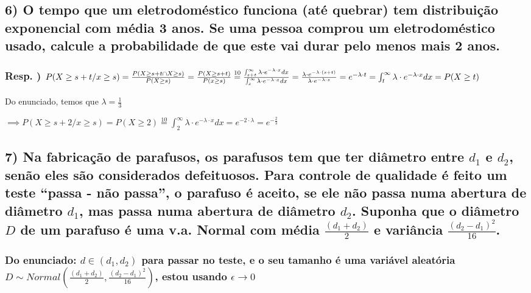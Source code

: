 \documentclass[english]{article}
\begin{document}
\textbf{\textcompwordmark{}}


\subsection*{\textmd{6) O tempo que um eletrodoméstico funciona (até quebrar)
tem distribuição exponencial com média 3 anos. Se uma pessoa comprou
um eletrodoméstico usado, calcule a probabilidade de que este vai
durar pelo menos mais 2 anos.}}


\subsubsection*{\textmd{Resp. ) $P(X\geq s+t/x\geq s)=\frac{P(X\geq s+t\cap X\geq s)}{P(X\geq s)}=\frac{P(X\geq s+t)}{P(x\geq s)}\protect\overset{10}{=}\frac{\int_{s+t}^{\infty}\lambda\cdot e^{-\lambda\cdot x}dx}{\int_{s}^{\infty}\lambda\cdot e^{-\lambda\cdot x}dx}=\frac{\lambda\cdot e^{-\lambda\cdot\left(s+t\right)}}{\lambda\cdot e^{-\lambda\cdot s}}=e^{-\lambda\cdot t}=\int_{t}^{\infty}\lambda\cdot e^{-\lambda\cdot x}dx=P(X\geq t)$}}

Do enunciado, temos que $\lambda=\frac{1}{3}$

$\implies P(X\geq s+2/x\geq s)=P(X\geq2)\overset{10}{=}\int_{2}^{\infty}\lambda\cdot e^{-\lambda\cdot x}dx=e^{-2\cdot\lambda}=e^{-\frac{2}{3}}$

\textbf{\textcompwordmark{}}


\subsection*{\textmd{7) Na fabricação de parafusos, os parafusos tem que ter diâmetro
entre $d_{1}$ e $d_{2}$, senão eles são considerados defeituosos.
Para controle de qualidade é feito um teste ``passa - não passa'',
o parafuso é aceito, se ele não passa numa abertura de diâmetro $d_{1}$,
mas passa numa abertura de diâmetro $d_{2}$. Suponha que o diâmetro
$D$ de um parafuso é uma v.a. Normal com média $\frac{\left(d_{1}+d_{2}\right)}{2}$
e variância $\frac{\left(d_{2}-d_{1}\right)^{2}}{16}$.}}


\subsubsection*{\textmd{Do enunciado: $d\in\left(d_{1},d_{2}\right)$ para passar
no teste, e o seu tamanho é uma variável aleatória $D\sim Normal(\frac{\left(d_{1}+d_{2}\right)}{2},\frac{\left(d_{2}-d_{1}\right)^{2}}{16})$,
estou usando $\epsilon\rightarrow0$}}
\end{document}
